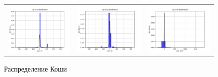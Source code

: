 \documentclass[../main.tex]{subfiles}
\begin{document}
	\begin{figure}[H]
		\centering
		\begin{tabular}{ccc}
			\includegraphics[width=55mm, height =0.25\textheight]{figures/cauchy_10.png} 
			&
			\includegraphics[width=55mm, height =0.25\textheight]{figures/cauchy_50.png}
			&
			\includegraphics[width=55mm, height =0.25\textheight]{figures/cauchy_1000.png}
		\end{tabular}
		\caption{Распределение Коши} 
		\label{fig:normal}
	\end{figure}
	
\end{document}
